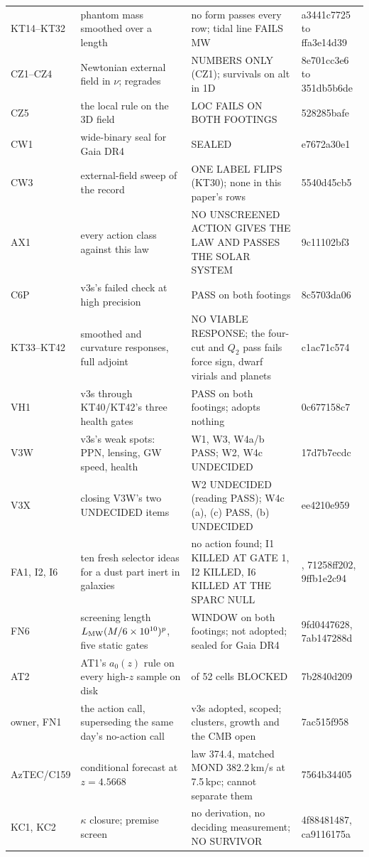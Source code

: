 \documentclass[10pt]{article}
\begin{document}
\begin{table}[!htbp]
\begin{tabular}{>{\raggedright\arraybackslash}p{1.9cm}>{\raggedright\arraybackslash}p{4.4cm}>{\raggedright\arraybackslash}p{6.2cm}>{\raggedright\arraybackslash}p{2.2cm}}
KT14--KT32 & phantom mass smoothed over a length & no form passes every row; tidal line FAILS MW & a3441c7725 to ffa3e14d39\\
CZ1--CZ4 & Newtonian external field in $\nu$; regrades & NUMBERS ONLY (CZ1); survivals on alt in 1D & 8e701cc3e6 to 351db5b6de\\
CZ5 & the local rule on the 3D field & LOC FAILS ON BOTH FOOTINGS & 528285bafe\\
CW1 & wide-binary seal for Gaia DR4 & SEALED & e7672a30e1\\
CW3 & external-field sweep of the record & ONE LABEL FLIPS (KT30); none in this paper's rows & 5540d45cb5\\
AX1 & every action class against this law & NO UNSCREENED ACTION GIVES THE LAW AND PASSES THE SOLAR SYSTEM & 9c11102bf3\\
C6P & v3s's failed check at high precision & PASS on both footings & 8c5703da06\\
KT33--KT42 & smoothed and curvature responses, full adjoint & NO VIABLE RESPONSE; the four-cut and $Q_2$ pass fails force sign, dwarf virials and planets & c1ac71c574\\
VH1 & v3s through KT40/KT42's three health gates & PASS on both footings; adopts nothing & 0c677158c7\\
V3W & v3s's weak spots: PPN, lensing, GW speed, health & W1, W3, W4a/b PASS; W2, W4c UNDECIDED & 17d7b7ecdc\\
V3X & closing V3W's two UNDECIDED items & W2 UNDECIDED (reading PASS); W4c (a), (c) PASS, (b) UNDECIDED & ee4210e959\\
FA1, I2, I6 & ten fresh selector ideas for a dust part inert in galaxies & no action found; I1 KILLED AT GATE 1, I2 KILLED, I6 KILLED AT THE SPARC NULL & 7064559430, 71258ff202, 9ffb1e2c94\\
FN6 & screening length $L_{\rm MW}(M/6\times10^{10})^p$, five static gates & WINDOW on both footings; not adopted; sealed for Gaia DR4 & 9fd0447628, 7ab147288d\\
AT2 & AT1's $a_0(z)$ rule on every high-$z$ sample on disk & 52 of 52 cells BLOCKED & 7b2840d209\\
owner, FN1 & the action call, superseding the same day's no-action call & v3s adopted, scoped; clusters, growth and the CMB open & 7ac515f958\\
AzTEC/C159 & conditional forecast at $z=4.5668$ & law 374.4, matched MOND 382.2\,km/s at 7.5\,kpc; cannot separate them & 7564b34405\\
KC1, KC2 & $\kappa$ closure; premise screen & no derivation, no deciding measurement; NO SURVIVOR & 4f88481487, ca9116175a\\

\end{tabular}
\end{table}
\end{document}
